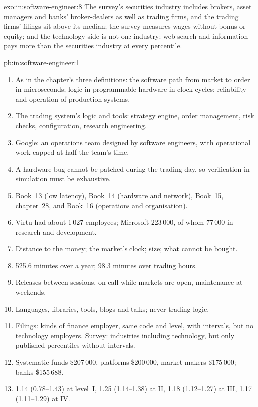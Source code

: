 \begin{solution}{exo:in:software-engineer:8}
The survey's securities industry includes brokers, asset managers and banks' broker-dealers as well as trading firms, and
the trading firms' filings sit above its median; the survey measures wages without bonus or equity; and the technology
side is not one industry: web search and information pays more than the securities industry at every percentile.
\end{solution}

\begin{solution}{pb:in:software-engineer:1}
\begin{enumerate}
\item As in the chapter's three definitions: the software path from market to order in microseconds; logic in
programmable hardware in clock cycles; reliability and operation of production systems.
\item The trading system's logic and tools: strategy engine, order management, risk checks, configuration, research
engineering.
\item Google: an operations team designed by software engineers, with operational work capped at half the team's time.
\item A hardware bug cannot be patched during the trading day, so verification in simulation must be exhaustive.
\item Book~13 (low latency), Book~14 (hardware and network), Book~15, chapter~28, and Book~16 (operations and
organisation).
\item Virtu had about 1\,027 employees; Microsoft 223\,000, of whom 77\,000 in research and development.
\item Distance to the money; the market's clock; size; what cannot be bought.
\item 525.6 minutes over a year; 98.3 minutes over trading hours.
\item Releases between sessions, on-call while markets are open, maintenance at weekends.
\item Languages, libraries, tools, blogs and talks; never trading logic.
\item Filings: kinds of finance employer, same code and level, with intervals, but no technology employers. Survey:
industries including technology, but only published percentiles without intervals.
\item Systematic funds \$207\,000, platforms \$200\,000, market makers \$175\,000; banks \$155\,688.
\item 1.14 (0.78--1.43) at level~I, 1.25 (1.14--1.38) at II, 1.18 (1.12--1.27) at III, 1.17 (1.11--1.29) at IV.

\end{enumerate}
\end{solution}
